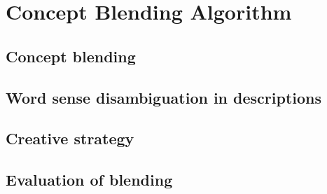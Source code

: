 
\chapter{Concept Blending Algorithm} %

\label{Chapter5} %


\section{Concept blending}


\section{Word sense disambiguation in descriptions}


\section{Creative strategy}


\section{Evaluation of blending}

